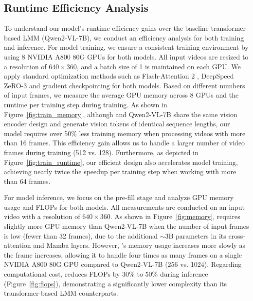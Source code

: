 \subsection{Runtime Efficiency Analysis}
To understand our model’s runtime efficiency gains over the baseline transformer-based LMM (Qwen2-VL-7B), we conduct an efficiency analysis for both training and inference. For model training, we ensure a consistent training environment by using 8 NVIDIA A800 80G GPUs for both models. All input videos are resized to a resolution of $640\times360$, and a batch size of 1 is maintained on each GPU. We apply standard optimization methods such as Flash-Attention 2 \cite{dao2023flashattention}, DeepSpeed ZeRO-3 \cite{rajbhandari2020zero} and gradient checkpointing \cite{chen2016training} for both models. Based on different numbers of input frames, we measure the average GPU memory across 8 GPUs and the runtime per training step during training. As shown in Figure~\ref{fig:train_memory}, although \model and Qwen2-VL-7B share the same vision encoder design and generate vision tokens of identical sequence lengths, our model requires over 50\% less training memory when processing videos with more than 16 frames. This efficiency gain allows us to handle a larger number of video frames during training (512 vs. 128). Furthermore, as depicted in Figure~\ref{fig:train_runtime}, our efficient design also accelerates model training, achieving nearly twice the speedup per training step when working with more than 64 frames.

For model inference, we focus on the pre-fill stage and analyze GPU memory usage and FLOPs for both models. All measurements are conducted on an input video with a resolution of $640\times 360$. As shown in Figure~\ref{fig:memory}, \model requires slightly more GPU memory than Qwen2-VL-7B when the number of input frames is low (fewer than 32 frames), due to the additional $\sim$3B parameters in its cross-attention and Mamba layers. However, \model's memory usage increases more slowly as the frame increases, allowing it to handle four times as many frames on a single NVIDIA A800 80G GPU compared to Qwen2-VL-7B (256 vs. 1024). Regarding computational cost, \model reduces FLOPs by 30\% to 50\% during inference (Figure~\ref{fig:flops}), demonstrating a significantly lower complexity than its transformer-based LMM counterparts.



